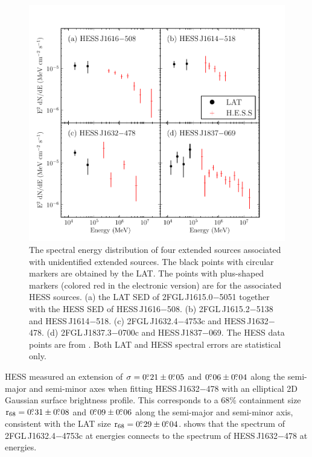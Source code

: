 \begin{figure}[htbp]
  \includegraphics{chapters/extended_search/figures/summary_plots/hess_seds_color.pdf}
  \caption{The spectral energy distribution of four extended
  sources associated with unidentified extended \tev sources.
  The black points with circular markers are obtained by the
  LAT. The points with plus-shaped markers (colored red in the
  electronic version) are for the associated \ac{HESS} sources.
  (a) the LAT SED of 2FGL\,J1615.0$-$5051 together with the
  \ac{HESS} SED of HESS\,J1616$-$508. (b) 2FGL\,J1615.2$-$5138 and
  HESS\,J1614$-$518. (c) 2FGL\,J1632.4$-$4753c and HESS\,J1632$-$478. (d)
  2FGL\,J1837.3$-$0700c and HESS\,J1837$-$069. The \ac{HESS} data points
  are from \citep{aharonian_2006a_h.e.s.s.-survey}. Both LAT and \ac{HESS}
  spectral errors are statistical only.}
  \end{figure}

\ac{HESS} measured an extension of $\sigma=0\mbox{$.\!\!^\circ$}21\pm0\mbox{$.\!\!^\circ$}05$ and
$0\mbox{$.\!\!^\circ$}06\pm0\mbox{$.\!\!^\circ$}04$ along the semi-major and semi-minor axes when
fitting HESS\,J1632$-$478 with an elliptical 2D Gaussian surface
brightness profile.  This corresponds to a 68\% containment size
${\mathrm{r}_{68}}=0\mbox{$.\!\!^\circ$}31\pm0\mbox{$.\!\!^\circ$}08$ and $0\mbox{$.\!\!^\circ$}09\pm0\mbox{$.\!\!^\circ$}06$ along
the semi-major and semi-minor axis, consistent with the LAT size
${\mathrm{r}_{68}}=0\mbox{$.\!\!^\circ$}29\pm0\mbox{$.\!\!^\circ$}04$.   shows that the
spectrum of 2FGL\,J1632.4$-$4753c at \gev energies connects to the
spectrum of HESS\,J1632$-$478 at \tev energies.

